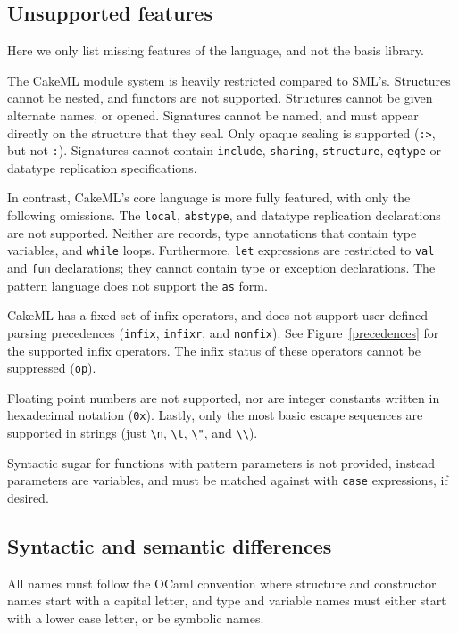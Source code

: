 \documentclass[12pt,a4paper]{book}
\begin{document}
\subsection{Unsupported features}
Here we only list missing features of the language, and not the basis library.

The CakeML module system is heavily restricted compared to SML's. Structures cannot be nested, and functors are not supported. Structures cannot be given alternate names, or opened. Signatures cannot be named, and must appear directly on the structure that they seal. Only opaque sealing is supported (\texttt{:>}, but not \texttt{:}). Signatures cannot contain \texttt{include}, \texttt{sharing}, \texttt{structure}, \texttt{eqtype} or datatype replication specifications.

In contrast, CakeML's core language is more fully featured, with only the following omissions. The \texttt{local}, \texttt{abstype}, and datatype replication declarations are not supported. Neither are records, type annotations that contain type variables, and \texttt{while} loops. Furthermore, \texttt{let} expressions are restricted to \texttt{val} and \texttt{fun} declarations; they cannot contain type or exception declarations. The pattern language does not support the \texttt{as} form.

CakeML has a fixed set of infix operators, and does not support user defined parsing precedences (\texttt{infix}, \texttt{infixr}, and \texttt{nonfix}). See Figure~\ref{precedences} for the supported infix operators. The infix status of these operators cannot be suppressed (\texttt{op}).

Floating point numbers are not supported, nor are integer constants written in hexadecimal notation (\texttt{0x}). Lastly, only the most basic escape sequences are supported in strings (just \texttt{\textbackslash n}, \texttt{\textbackslash t}, \texttt{\textbackslash "}, and \texttt{\textbackslash\textbackslash}).

Syntactic sugar for functions with pattern parameters is not provided, instead parameters are variables, and must be matched against with \texttt{case} expressions, if desired.

\subsection{Syntactic and semantic differences}

All names must follow the OCaml convention where structure and constructor names start with a capital letter, and type and variable names must either start with a lower case letter, or be symbolic names.
\end{document}
